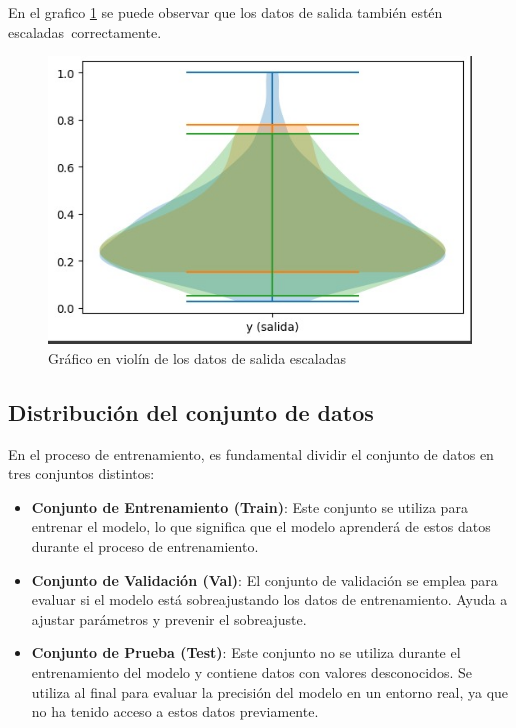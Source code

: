 En el grafico \ref{fig:grafico_violin_salida} se puede observar que los datos de salida también estén escaladas correctamente.
\begin{figure}[H]
  \begin{center}
    \includegraphics[scale=0.50]{./grafico_violin_salida.jpg}
    \caption{Gráfico en violín de los datos de salida escaladas}
    \label{fig:grafico_violin_salida}
  \end{center}
\end{figure}

\subsection{Distribución del conjunto de datos}

En el proceso de entrenamiento, es fundamental dividir el conjunto de datos en tres conjuntos distintos:

\begin{itemize}
  \item \textbf{Conjunto de Entrenamiento (Train)}: Este conjunto se utiliza para entrenar el modelo, lo que significa que el modelo aprenderá de estos datos durante el proceso de entrenamiento.

  \item \textbf{Conjunto de Validación (Val)}: El conjunto de validación se emplea para evaluar si el modelo está sobreajustando los datos de entrenamiento. Ayuda a ajustar parámetros y prevenir el sobreajuste.

  \item \textbf{Conjunto de Prueba (Test)}: Este conjunto no se utiliza durante el entrenamiento del modelo y contiene datos con valores desconocidos. Se utiliza al final para evaluar la precisión del modelo en un entorno real, ya que no ha tenido acceso a estos datos previamente.
\end{itemize}


